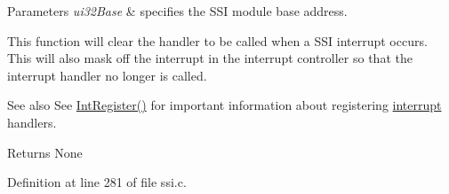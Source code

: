 \begin{DoxyParams}{Parameters}
{\em ui32\+Base} & specifies the S\+SI module base address.\\
\hline
\end{DoxyParams}
This function will clear the handler to be called when a S\+SI interrupt occurs. This will also mask off the interrupt in the interrupt controller so that the interrupt handler no longer is called.

\begin{DoxySeeAlso}{See also}
See \hyperlink{group__interrupt__api_ga0a32aafea7f4904d2a64ee18b45f96c9}{Int\+Register()} for important information about registering \hyperlink{_g_c_c_2_m_s_p430_f449_2port_8c_ae0992854bdba99f7b163894433c32aef}{interrupt} handlers.
\end{DoxySeeAlso}
\begin{DoxyReturn}{Returns}
None 
\end{DoxyReturn}


Definition at line 281 of file ssi.\+c.

